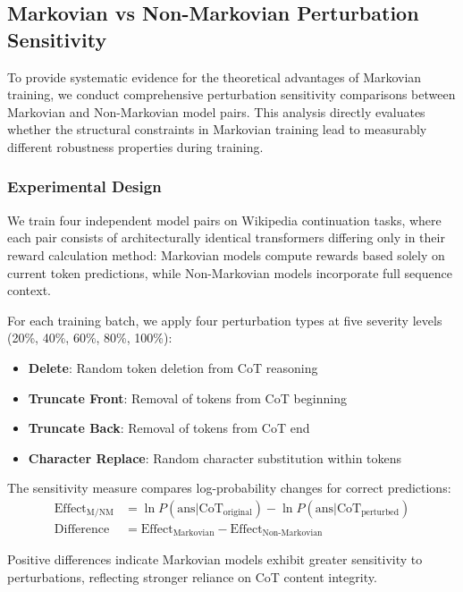 \documentclass[letterpaper]{article} %
\begin{document}
\subsection{Markovian vs Non-Markovian Perturbation Sensitivity}\label{subsec:markovian_sensitivity}

To provide systematic evidence for the theoretical advantages of Markovian training, we conduct comprehensive perturbation sensitivity comparisons between Markovian and Non-Markovian model pairs. This analysis directly evaluates whether the structural constraints in Markovian training lead to measurably different robustness properties during training.

\subsubsection{Experimental Design}
We train four independent model pairs on Wikipedia continuation tasks, where each pair consists of architecturally identical transformers differing only in their reward calculation method: Markovian models compute rewards based solely on current token predictions, while Non-Markovian models incorporate full sequence context.

For each training batch, we apply four perturbation types at five severity levels (20\%, 40\%, 60\%, 80\%, 100\%):
\begin{itemize}
    \item \textbf{Delete}: Random token deletion from CoT reasoning
    \item \textbf{Truncate Front}: Removal of tokens from CoT beginning  
    \item \textbf{Truncate Back}: Removal of tokens from CoT end
    \item \textbf{Character Replace}: Random character substitution within tokens
\end{itemize}

The sensitivity measure compares log-probability changes for correct predictions:
\begin{align}
\text{Effect}_{\text{M/NM}} &= \ln P(\text{ans}|\text{CoT}_{\text{original}}) - \ln P(\text{ans}|\text{CoT}_{\text{perturbed}}) \\
\text{Difference} &= \text{Effect}_{\text{Markovian}} - \text{Effect}_{\text{Non-Markovian}}
\end{align}

Positive differences indicate Markovian models exhibit greater sensitivity to perturbations, reflecting stronger reliance on CoT content integrity.
\end{document}
